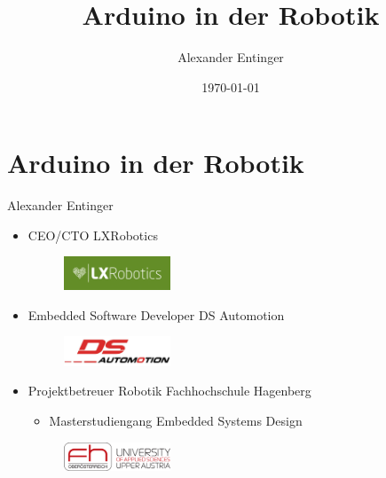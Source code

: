 \documentclass{beamer}
\title[]{Arduino in der Robotik} %
\author{Alexander Entinger} %
\institute{LXRobotics GmbH}
\date{\today} %
\begin{document}
\section{Arduino in der Robotik}
\begin{frame}
\titlepage %
\end{frame}
\begin{frame}{Alexander Entinger}
\begin{itemize}
 \item CEO/CTO LXRobotics
  \begin{figure}[H]
   \centering
   \includegraphics[width=0.3\textwidth]{./images/logo-lxrobotics.png}
   \label{fig:logo-lxrobotics}
  \end{figure}
\end{itemize}
\begin{itemize}
 \item Embedded Software Developer DS Automotion
  \begin{figure}[H]
   \centering
   \includegraphics[width=0.3\textwidth]{./images/logo-ds-automotion.jpg}
   \label{fig:logo-ds-automotion}
  \end{figure}
\end{itemize}
\begin{itemize}
 \item Projektbetreuer Robotik Fachhochschule Hagenberg
 \begin{itemize}
  \item Masterstudiengang Embedded Systems Design
 \end{itemize}
   \begin{figure}[H]
    \centering
    \includegraphics[width=0.3\textwidth]{./images/logo-fh-hagenberg.png}
    \label{fig:logo-fh-hagenberg}
   \end{figure}
\end{itemize}
\end{frame}
\end{document}
